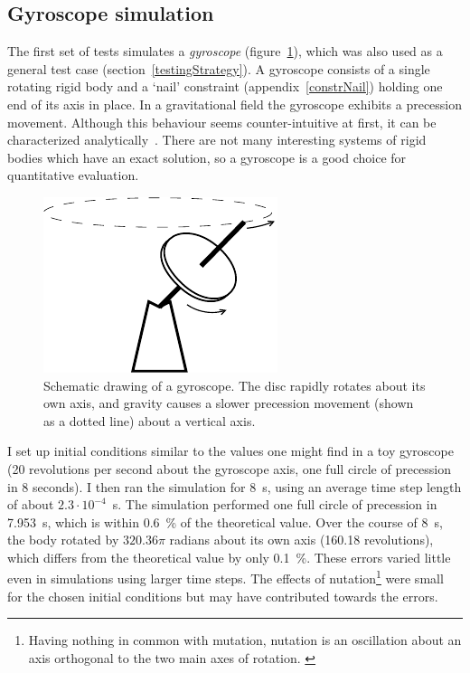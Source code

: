 \subsection{Gyroscope simulation\label{evalGyroscope}}
The first set of tests simulates a \emph{gyroscope} (figure~\ref{gyroscope}), which was also used
as a general test case (section~\ref{testingStrategy}). A gyroscope consists of a single rotating
rigid body and a `nail' constraint (appendix~\ref{constrNail}) holding one end of its axis in
place. In a gravitational field the gyroscope exhibits a precession movement. Although this
behaviour seems counter-intuitive at first, it can be characterized analytically~\cite{Julian:notes}.
There are not many interesting systems of rigid bodies which have an exact solution, so a
gyroscope is a good choice for quantitative evaluation.

\begin{figure}
\centerline{\includegraphics{figures/gyroscope}}
\caption{Schematic drawing of a gyroscope. The disc rapidly rotates about its own axis, and
    gravity causes a slower precession movement (shown as a dotted line) about a vertical axis.
    \label{gyroscope}}
\end{figure}

I set up initial conditions similar to the values one might find in a toy gyroscope (20
revolutions per second about the gyroscope axis, one full circle of precession in 8 seconds). I
then ran the simulation for 8~s, using an average time step length of about $2.3\cdot 10^{-4}$~s.
The simulation performed one full circle of precession in 7.953~s, which
is within 0.6~\% of the theoretical value. Over the course of 8~s, the body rotated by $320.36\pi$
radians about its own axis (160.18 revolutions), which differs from the theoretical value by only
0.1~\%. These errors varied little even in simulations using larger time steps. The effects of
nutation\footnote{Having nothing in common with mutation, nutation is an oscillation about an axis
orthogonal to the two main axes of rotation. \cite{Feynman:63}} were small for the chosen initial
conditions but may have contributed towards the errors.

